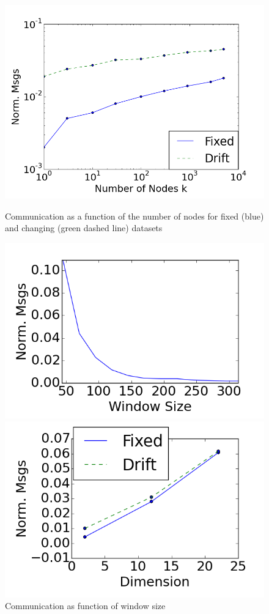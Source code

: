 \documentclass{vldb}
\begin{document}
\begin{figure}[!htb]
\centering
{}
    \centering
  \includegraphics[width=\linewidth]{CommunicationOfFixedVsDrift/Nodes.png}
  \caption{Communication as a function of the number of nodes for fixed (blue)
  and changing (green dashed line) datasets}\label{Nodes}
  \endminipage\hfill
{}
    \centering
  \includegraphics[width=\linewidth]{CommunicationOfFixedVsDrift/WindowSize.png}
  \caption{Communication as function of window size }\label{WindowSize}
  \endminipage\hfill
{}
    \centering
  \includegraphics[width=\linewidth]{CommunicationOfFixedVsDrift/Dimension.png}

\end{figure}
\end{document}
